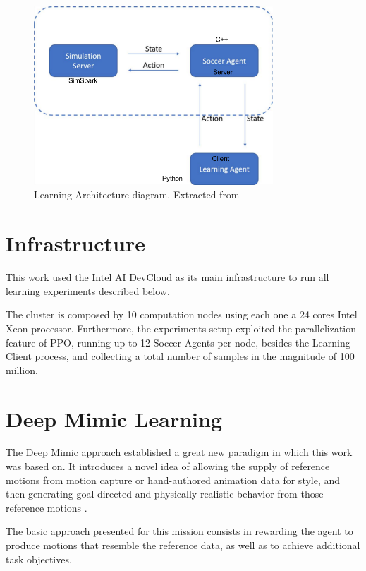 \begin{figure}[H]
    \centering
    \includegraphics[width=0.8\textwidth]{Chapter6/architecture.png} 
    \caption{Learning Architecture diagram. Extracted from \cite{TGMuzio}}
    \label{fig:RL_framework}
\end{figure}

\section{Infrastructure}

This work used the Intel AI DevCloud as its main infrastructure to run all learning experiments described below.

The cluster is composed by 10 computation nodes using each one a 24 cores Intel Xeon processor. Furthermore, the experiments setup exploited the parallelization feature of PPO, running up to 12 Soccer Agents per node, besides the Learning Client process, and collecting a total number of samples in the magnitude of 100 million.

\section{Deep Mimic Learning}

The Deep Mimic approach \cite{deepmimic} established a great new paradigm in which this work was based on. It introduces a novel idea of allowing the supply of reference motions from motion capture or hand-authored animation data for style, and then generating goal-directed and physically realistic behavior from those reference motions \cite{deepmimic}.

The basic approach presented for this mission consists in rewarding the agent to produce motions that resemble the reference data, as well as to achieve additional task objectives.

